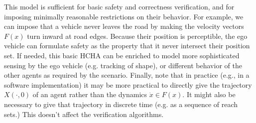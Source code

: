This model is sufficient for basic safety and correctness verification, and for imposing minimally reasonable restrictions on their behavior. 
For example, we can impose that a vehicle never leaves the road by making the velocity vectors $F(x)$ turn inward at road edges.
Because their position is perceptible, the ego vehicle can formulate safety as the property that it never intersect their position set.
If needed, this basic HCHA can be enriched to model more sophisticated sensing by the ego vehicle (e.g. tracking of shape), or different behavior of the other agents as required by the scenario.
Finally, note that in practice (e.g., in a software implementation) it may be more practical to directly give the trajectory $X(\cdot,0)$ of an agent rather than the dynamics $\dot{x} \in F(x)$. 
It might also be necessary to give that trajectory in discrete time (e.g. as a sequence of reach sets.)
This doesn't affect the verification algorithms.

